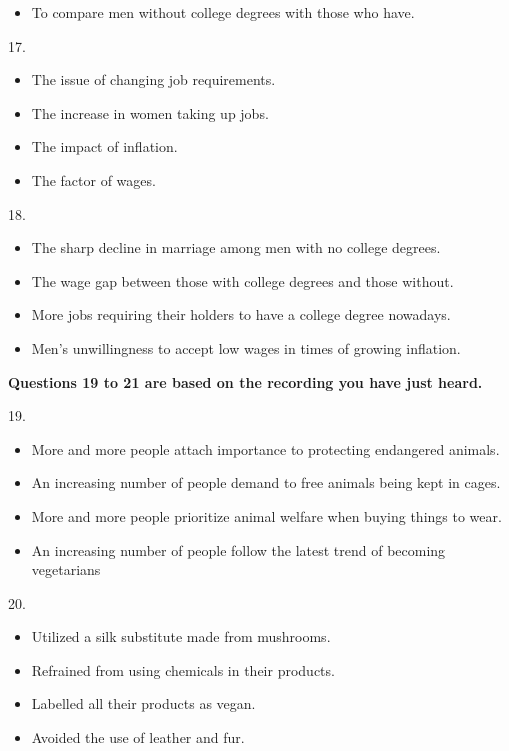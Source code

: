 \documentclass[UTF8,11pt]{ctexart}
\begin{document}
\begin{itemize}[leftmargin=2em,itemsep=.2em,topsep=.4em]\item[D.] To compare men without college degrees with those who have.
\end{itemize}

17.


\begin{itemize}[leftmargin=2em,itemsep=.2em,topsep=.4em]\item[A.] The issue of changing job requirements.
\item[B.] The increase in women taking up jobs.
\item[C.] The impact of inflation.
\item[D.] The factor of wages.
\end{itemize}

18.


\begin{itemize}[leftmargin=2em,itemsep=.2em,topsep=.4em]\item[A.] The sharp decline in marriage among men with no college degrees.
\item[B.] The wage gap between those with college degrees and those without.
\item[C.] More jobs requiring their holders to have a college degree nowadays.
\item[D.] Men’s unwillingness to accept low wages in times of growing inflation.
\end{itemize}

\textbf{Questions 19 to 21 are based on the recording you have just heard.}


19.


\begin{itemize}[leftmargin=2em,itemsep=.2em,topsep=.4em]\item[A.] More and more people attach importance to protecting endangered animals.
\item[B.] An increasing number of people demand to free animals being kept in cages.
\item[C.] More and more people prioritize animal welfare when buying things to wear.
\item[D.] An increasing number of people follow the latest trend of becoming vegetarians
\end{itemize}

20.


\begin{itemize}[leftmargin=2em,itemsep=.2em,topsep=.4em]\item[A.] Utilized a silk substitute made from mushrooms.
\item[B.] Refrained from using chemicals in their products.
\item[C.] Labelled all their products as vegan.
\item[D.] Avoided the use of leather and fur.
\end{itemize}
\end{document}
